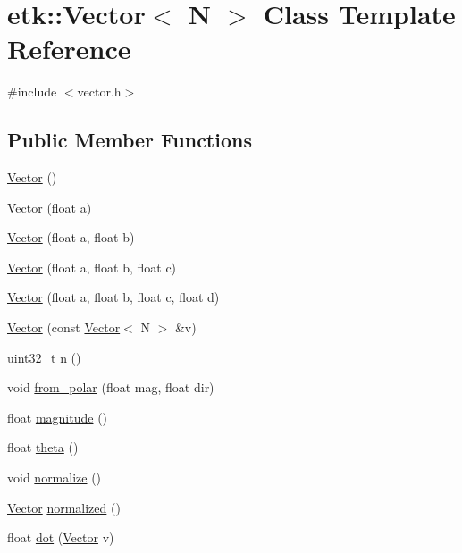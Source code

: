 \hypertarget{classetk_1_1_vector}{\section{etk\-:\-:Vector$<$ N $>$ Class Template Reference}
\label{classetk_1_1_vector}
}


{\ttfamily \#include $<$vector.\-h$>$}

\subsection*{Public Member Functions}
\begin{DoxyCompactItemize}
\item 
\hyperlink{classetk_1_1_vector_ab1d972a722bbec81c523e157e2190131}{Vector} ()
\item 
\hyperlink{classetk_1_1_vector_a14326a5c9a22841c14c807b706de55a7}{Vector} (float a)
\item 
\hyperlink{classetk_1_1_vector_aeac80a1eb4747783c2bb583132d530fa}{Vector} (float a, float b)
\item 
\hyperlink{classetk_1_1_vector_abaf5f91e99c86a524a63a2ef2b3e343a}{Vector} (float a, float b, float c)
\item 
\hyperlink{classetk_1_1_vector_a2f0d81e6bf1759d050aa71489d2db816}{Vector} (float a, float b, float c, float d)
\item 
\hyperlink{classetk_1_1_vector_a481e7f68fc0703cc25a337e2ba20fd62}{Vector} (const \hyperlink{classetk_1_1_vector}{Vector}$<$ N $>$ \&v)
\item 
uint32\-\_\-t \hyperlink{classetk_1_1_vector_adc7028cab173d941591af508a7611325}{n} ()
\item 
void \hyperlink{classetk_1_1_vector_a7be874bc2760b72d2d0233fcb378577b}{from\-\_\-polar} (float mag, float dir)
\item 
float \hyperlink{classetk_1_1_vector_a6a317e470cbbf7124509e3a3f3c2ded0}{magnitude} ()
\item 
float \hyperlink{classetk_1_1_vector_ae5d960a3fa9572c1754e2aed9c1378cf}{theta} ()
\item 
void \hyperlink{classetk_1_1_vector_ae7f3db6458bd9a6e03dd8b24f2770dc5}{normalize} ()
\item 
\hyperlink{classetk_1_1_vector}{Vector} \hyperlink{classetk_1_1_vector_aea85c6a2ccfa94d6591d226deefdf515}{normalized} ()
\item 
float \hyperlink{classetk_1_1_vector_aba724addf2789f07bddd047a9949ed8e}{dot} (\hyperlink{classetk_1_1_vector}{Vector} v)

\end{DoxyCompactItemize}
